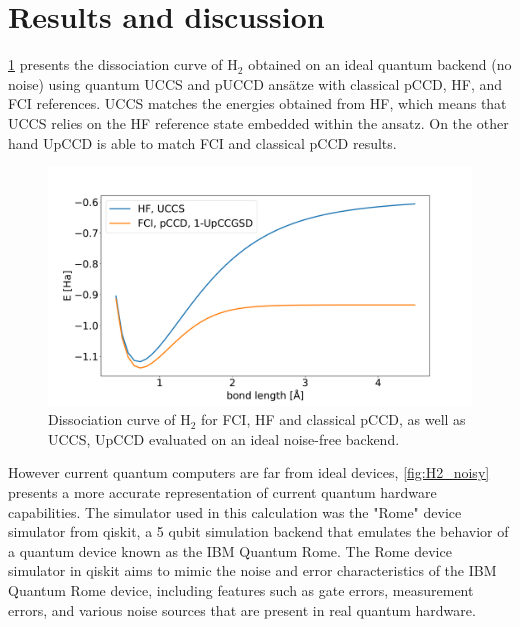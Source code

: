 \documentclass[twoside,twocolumn,9pt]{article}
\begin{document}
{\section{Results and discussion}

\cref{fig:H2} presents the dissociation curve of $\text{H}_2$ obtained on an ideal quantum backend (no noise) using quantum UCCS and pUCCD ansätze with classical pCCD, HF, and FCI references. UCCS matches the energies obtained from HF, which means that UCCS relies on the HF reference state embedded within the ansatz. On the other hand UpCCD is able to match FCI and classical pCCD results.

\begin{center}
  \begin{figure}[h]
      \includegraphics[width=\linewidth]{QC_UCC_HH.pdf}
      \caption{Dissociation curve of $\text{H}_2$ for FCI, HF and classical pCCD, as well as UCCS, UpCCD evaluated on an ideal noise-free backend.}
      \label{fig:H2} 
  \end{figure}
\end{center}

However current quantum computers are far from ideal devices, \cref{fig:H2_noisy} presents a more accurate representation of current quantum hardware capabilities. The simulator used in this calculation was the "Rome" device simulator from qiskit, a 5 qubit simulation backend that emulates the behavior of a quantum device known as the IBM Quantum Rome. The Rome device simulator in qiskit aims to mimic the noise and error characteristics of the IBM Quantum Rome device, including features such as gate errors, measurement errors, and various noise sources that are present in real quantum hardware.

}
\end{document}
